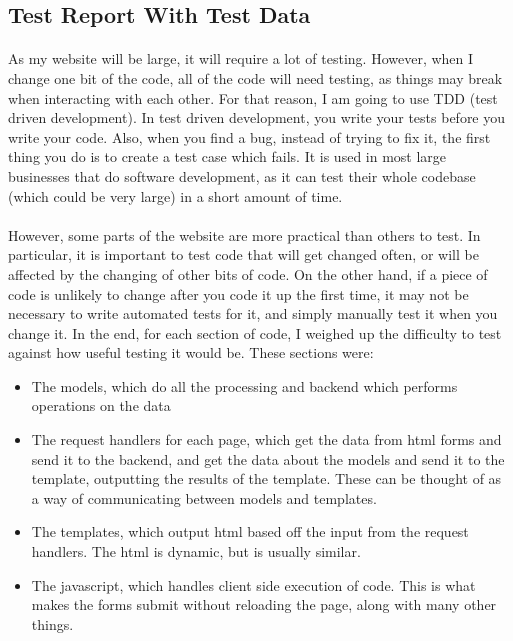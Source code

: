 \subsection{Test Report With Test Data}
\paragraph{}
As my website will be large, it will require a lot of testing. However, when I change one bit of the code, all of the code will need testing, as things may break when interacting with each other. For that reason, I am going to use TDD (test driven development). In test driven development, you write your tests before you write your code. Also, when you find a bug, instead of trying to fix it, the first thing you do is to create a test case which fails. It is used in most large businesses that do software development, as it can test their whole codebase (which could be very large) in a short amount of time.

\paragraph{}
However, some parts of the website are more practical than others to test. In particular, it is important to test code that will get changed often, or will be affected by the changing of other bits of code. On the other hand, if a piece of code is unlikely to change after you code it up the first time, it may not be necessary to write automated tests for it, and simply manually test it when you change it. In the end, for each section of code, I weighed up the difficulty to test against how useful testing it would be. These sections were:
\begin{itemize}
	\item The models, which do all the processing and backend which performs operations on the data
	\item The request handlers for each page, which get the data from html forms and send it to the backend, and get the data about the models and send it to the template, outputting the results of the template. These can be thought of as a way of communicating between models and templates.
	\item The templates, which output html based off the input from the request handlers. The html is dynamic, but is usually similar.
	\item The javascript, which handles client side execution of code. This is what makes the forms submit without reloading the page, along with many other things.
\end{itemize}

